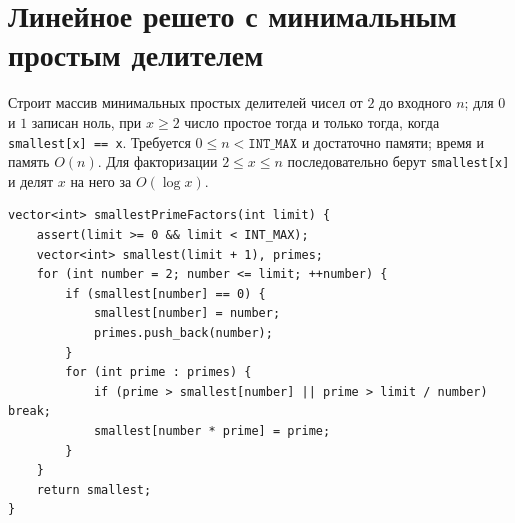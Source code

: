 \section{Линейное решето с минимальным простым делителем}
Строит массив минимальных простых делителей чисел от $2$ до входного $n$; для $0$ и $1$ записан ноль, при $x\ge2$ число простое тогда и только тогда, когда \texttt{smallest[x] == x}.
Требуется $0\le n<\texttt{INT\_MAX}$ и достаточно памяти; время и память $O(n)$.
Для факторизации $2\le x\le n$ последовательно берут \texttt{smallest[x]} и делят $x$ на него за $O(\log x)$.
\begin{lstlisting}[name=math_sieve]
vector<int> smallestPrimeFactors(int limit) {
    assert(limit >= 0 && limit < INT_MAX);
    vector<int> smallest(limit + 1), primes;
    for (int number = 2; number <= limit; ++number) {
        if (smallest[number] == 0) {
            smallest[number] = number;
            primes.push_back(number);
        }
        for (int prime : primes) {
            if (prime > smallest[number] || prime > limit / number) break;
            smallest[number * prime] = prime;
        }
    }
    return smallest;
}
\end{lstlisting}
%

